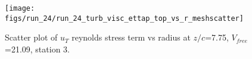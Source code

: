 \begin{figure}[H]
\centering
\texttt{[image: figs/run\_24/run\_24\_turb\_visc\_ettap\_top\_vs\_r\_meshscatter]}
\caption{Scatter plot of $
u_T$ reynolds stress term vs radius at $z/c$=7.75, $V_{free}$=21.09, station 3.}
\label{fig:run_24_turb_visc_ettap_top_vs_r_meshscatter}
\end{figure}


